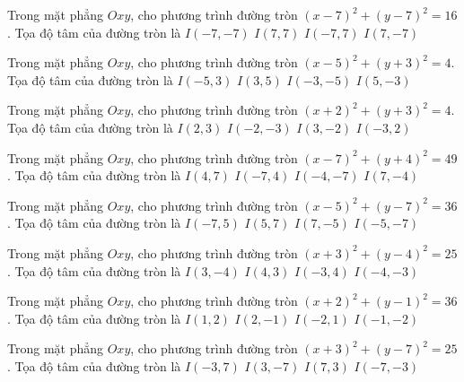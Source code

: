 \begin{ex}
Trong mặt phẳng $Oxy$, cho phương trình đường tròn $(x -7)^2   + (y -7)^2 = 16$. Tọa độ tâm của đường tròn là
\choice
{ $I(-7, -7)$ }
{ \True $I(7, 7)$ }
{ $I(-7, 7)$ }
{ $I(7, -7)$ }
\end{ex}

\begin{ex}
Trong mặt phẳng $Oxy$, cho phương trình đường tròn $(x -5)^2   + (y + 3)^2 = 4$. Tọa độ tâm của đường tròn là
\choice
{ $I(-5, 3)$ }
{ $I(3, 5)$ }
{ $I(-3, -5)$ }
{ \True $I(5, -3)$ }
\end{ex}

\begin{ex}
Trong mặt phẳng $Oxy$, cho phương trình đường tròn $(x + 2)^2  + (y + 3)^2 = 4$. Tọa độ tâm của đường tròn là
\choice
{ $I(2, 3)$ }
{ \True $I(-2, -3)$ }
{ $I(3, -2)$ }
{ $I(-3, 2)$ }
\end{ex}

\begin{ex}
Trong mặt phẳng $Oxy$, cho phương trình đường tròn $(x -7)^2   + (y + 4)^2 = 49$. Tọa độ tâm của đường tròn là
\choice
{ $I(4, 7)$ }
{ $I(-7, 4)$ }
{ $I(-4, -7)$ }
{ \True $I(7, -4)$ }
\end{ex}

\begin{ex}
Trong mặt phẳng $Oxy$, cho phương trình đường tròn $(x -5)^2   + (y -7)^2 = 36$. Tọa độ tâm của đường tròn là
\choice
{ $I(-7, 5)$ }
{ \True $I(5, 7)$ }
{ $I(7, -5)$ }
{ $I(-5, -7)$ }
\end{ex}

\begin{ex}
Trong mặt phẳng $Oxy$, cho phương trình đường tròn $(x + 3)^2  + (y -4)^2 = 25$. Tọa độ tâm của đường tròn là
\choice
{ $I(3, -4)$ }
{ $I(4, 3)$ }
{ \True $I(-3, 4)$ }
{ $I(-4, -3)$ }
\end{ex}

\begin{ex}
Trong mặt phẳng $Oxy$, cho phương trình đường tròn $(x + 2)^2  + (y -1)^2 = 36$. Tọa độ tâm của đường tròn là
\choice
{ $I(1, 2)$ }
{ $I(2, -1)$ }
{ \True $I(-2, 1)$ }
{ $I(-1, -2)$ }
\end{ex}

\begin{ex}
Trong mặt phẳng $Oxy$, cho phương trình đường tròn $(x + 3)^2  + (y -7)^2 = 25$. Tọa độ tâm của đường tròn là
\choice
{ \True $I(-3, 7)$ }
{ $I(3, -7)$ }
{ $I(7, 3)$ }
{ $I(-7, -3)$ }
\end{ex}

